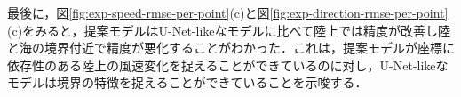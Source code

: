 最後に，図\ref{fig:exp-speed-rmse-per-point}(c)と図\ref{fig:exp-direction-rmse-per-point}(c)をみると，提案モデルはU-Net-likeなモデルに比べて陸上では精度が改善し陸と海の境界付近で精度が悪化することがわかった．これは，提案モデルが座標に依存性のある陸上の風速変化を捉えることができているのに対し，U-Net-likeなモデルは境界の特徴を捉えることができていることを示唆する．

